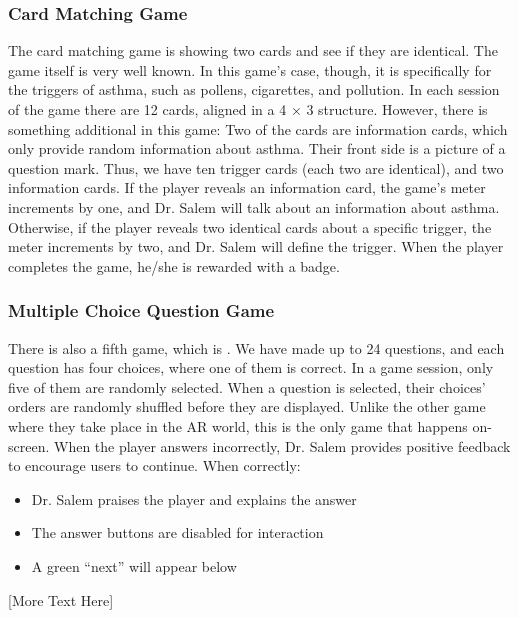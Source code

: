 \subsubsection*{Card Matching Game}
The card matching game is showing two cards and see if they are identical. The game itself is very well known. In this game’s case, though, it is specifically for the triggers of asthma, such as pollens, cigarettes, and pollution. In each session of the game there are 12 cards, aligned in a 4 × 3 structure. However, there is something additional in this game: Two of the cards are information cards, which only provide random information about asthma. Their front side is a picture of a question mark. Thus, we have ten trigger cards (each two are identical), and two information cards. If the player reveals an information card, the game’s meter increments by one, and Dr. Salem will talk about an information about asthma. Otherwise, if the player reveals two identical cards about a specific trigger, the meter increments by two, and Dr. Salem will define the trigger. When the player completes the game, he/she is rewarded with a badge.
\subsubsection*{Multiple Choice Question Game}
There is also a fifth game, which is . We have made up to 24 questions, and each question has four choices, where one of them is correct. In a game session, only five of them are randomly selected. When a question is selected, their choices' orders are randomly shuffled before they are displayed. Unlike the other game where they take place in the \acrshort{AR} world, this is the only game that happens on-screen. When the player answers incorrectly, Dr. Salem provides positive feedback to encourage users to continue. When correctly:
\begin{itemize}
\item{Dr. Salem praises the player and explains the answer}

\item{The answer buttons are disabled for interaction}

\item{A green “next” will appear below}
\end{itemize}

[More Text Here]

